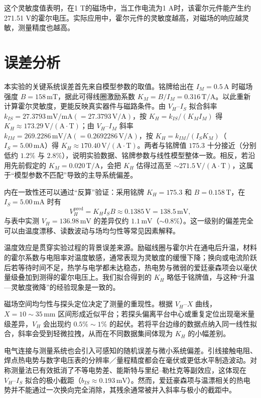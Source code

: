 ﻿\documentclass[12pt,a4paper]{article}
\begin{document}
这个灵敏度值表明，在1 T的磁场中，当工作电流为1 A时，该霍尔元件能产生约271.51 V的霍尔电压。实际应用中，霍尔元件的灵敏度越高，对磁场的响应越灵敏，测量精度也越高。

\section{误差分析}

本实验的关键系统误差首先来自模型参数的取值。铭牌给出在 $I_M=0.5\,\mathrm{A}$ 时磁场强度 $B=158\,\mathrm{mT}$，据此可得线圈激励系数 $K_M=B/I_M=0.316\,\mathrm{T/A}$。以此重新计算霍尔灵敏度，更能反映真实器件与磁路条件。由 $V_H$–$I_S$ 拟合斜率 $k_{IS}=27.3793\,\mathrm{mV/mA}(=27.3793\,\mathrm{V/A})$，按 $K_H=k_{IS}/(K_M I_M)$ 得 $K_H\approx 173.29\,\mathrm{V/(A\cdot T)}$；由 $V_H$–$I_M$ 斜率 $k_{IM}=269.2286\,\mathrm{mV/A}(=0.2692286\,\mathrm{V/A})$，按 $K_H=k_{IM}/(I_S K_M)$（$I_S=5.00\,\mathrm{mA}$）得 $K_H\approx 170.40\,\mathrm{V/(A\cdot T)}$。两者与铭牌值 $175.3$ 十分接近（分别低约 $1.2\%$ 与 $2.8\%$），说明实验数据、铭牌参数与线性模型整体一致。相反，若沿用先前假定的 $K_M=0.020\,\mathrm{T/A}$，会把 $K_H$ 估得过高至 $\sim 271.5\,\mathrm{V/(A\cdot T)}$，这属于“模型参数不匹配”导致的主导系统偏差。

内在一致性还可以通过“反算”验证：采用铭牌 $K_H=175.3$ 和 $B=0.158\,\mathrm{T}$，在 $I_S=5.00\,\mathrm{mA}$ 时有
\[ V_H^{\mathrm{pred}}=K_H I_S B \approx 0.1385\,\mathrm{V}=138.5\,\mathrm{mV}, \]
与表中实测 $V_H=136.98\,\mathrm{mV}$ 的差异仅约 $1.1\,\mathrm{mV}$（$\sim 0.8\%$）。这一级别的偏差完全可以由温度漂移、读数波动与场均匀性等常见因素解释。

温度效应是贯穿实验过程的背景误差来源。励磁线圈与霍尔片在通电后升温，材料的霍尔系数与电阻率对温度敏感，通常表现为灵敏度的缓慢下降；换向或电流阶跃后若等待时间不足，热学与电学都未达稳态，热电势与微弱的爱廷豪森项会以毫伏量级叠加到测得的霍尔电压上。我们拟合得到的 $K_H$ 略低于铭牌值，与这种“升温—灵敏度微降”的经验现象是一致的。

磁场空间均匀性与探头定位决定了测量的重现性。根据 $V_H$–$X$ 曲线，$X=10\!\sim\!35\,\mathrm{mm}$ 区间形成近似平台；若探头偏离平台中心或重复定位出现毫米量级差异，$V_H$ 会出现约 $0.5\%\!\sim\!1\%$ 的起伏。若将平台边缘的数据点纳入同一线性拟合，斜率会受到轻微拉拽，从而在不同数据集间体现为 $K_H$ 的小幅差别。

电气连接与测量系统也会引入可感知的随机误差与微小系统偏差。引线接触电阻、焊点热电势与数字电压表的分辨率／量程精度都会在毫伏或更低水平制造波动。对称测量法已有效抵消了不等电势差、能斯特与里纪–勒杜克等副效应，这体现在 $V_H$–$I_S$ 拟合的极小截距（$b_{IS}\approx 0.193\,\mathrm{mV}$）。然而，爱廷豪森项与温漂相关的热电势并不能通过一次换向完全消除，其残余通常被并入斜率与极小的截距中。
\end{document}
